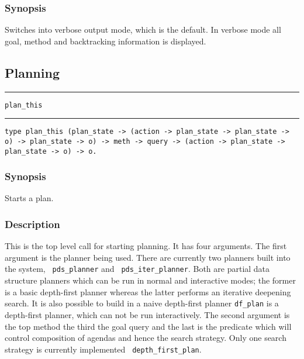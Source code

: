 
\subsubsection*{Synopsis}
Switches \lclam into verbose output mode, which is the default.  In
verbose mode all goal, method and backtracking information is
displayed.

\subsection{Planning}

\hrule \vspace{2mm}
\noindent
\begin{Large}{\tt plan\_this}
\end{Large}
\vspace{2mm}
\hrule
\vspace{2mm}
{\tt type plan\_this (plan\_state -> (action -> plan\_state -> plan\_state -> o) -> plan\_state -> o) 
   -> meth
   -> query
   -> (action -> plan\_state -> plan\_state -> o) -> o.
}

\subsubsection*{Synopsis}
Starts a plan.

\subsubsection*{Description}
This is the top level call for starting planning.  It has four
arguments.  The first argument is the planner being used.  There are
currently two planners built into the system, {\tt
  pds\_planner} and {\tt
  pds\_iter\_planner}.  Both are partial
data structure planners which can be run in normal and interactive
modes; the former is a basic depth-first planner whereas the latter
performs an iterative deepening search.  It is also possible to build
in a naive depth-first planner {\tt df\_plan} is a
depth-first planner, which can not be run interactively.  The second
argument is the top method the third the goal
query and the last is the predicate which
will control composition of
agendas and
hence the search strategy.  Only one search
strategy is currently implemented {\tt
  depth\_first\_plan}.


